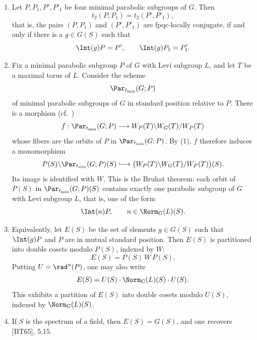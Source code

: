 \begin{enumerate}[label=\textup{(\arabic*)}]
\item Let \(P,P_1,P',P'_1\) be four minimal parabolic subgroups of
\(G\).  Then
\[
 t_2(P,P_1)=t_2(P',P'_1),
\]
that is, the pairs \((P,P_1)\) and \((P',P'_1)\) are fpqc-locally
conjugate, if and only if there is a \(g\in G(S)\) such that
\[
 \Int(g)P=P',\qquad \Int(g)P_1=P'_1.
\]

\item Fix a minimal parabolic subgroup \(P\) of \(G\) with Levi
subgroup \(L\), and let \(T\) be a maximal torus of \(L\).  Consider
the scheme
\[
 \Par_{t_{\min}}(G;P)
\]
of minimal parabolic subgroups of \(G\) in standard position
relative to \(P\).  There is a morphism \textup{(cf.\ )}
\[
 f:\Par_{t_{\min}}(G;P)
   \longrightarrow W_P(T)\backslash W_G(T)/W_P(T)
\]
whose fibers are the orbits of \(P\) in
\(\Par_{t_{\min}}(G;P)\).  By \textup{(1)}, \(f\) therefore induces
a monomorphism
\[
 P(S)\backslash\Par_{t_{\min}}(G;P)(S)
 \lhook\joinrel\longrightarrow
 \bigl(W_P(T)\backslash W_G(T)/W_P(T)\bigr)(S).
\]
Its image is identified with \(W\).  This is the Bruhat theorem:
each orbit of \(P(S)\) in \(\Par_{t_{\min}}(G;P)(S)\) contains
exactly one parabolic subgroup of \(G\) with Levi subgroup \(L\),
that is, one of the form
\[
 \Int(n)P,\qquad n\in\Norm_G(L)(S).
\]

\item Equivalently, let \(E(S)\) be the set of elements \(g\in G(S)\)
such that \(\Int(g)P\) and \(P\) are in mutual standard position.
Then \(E(S)\) is partitioned into double cosets modulo \(P(S)\),
indexed by \(W\):
\[
 E(S)=P(S)\,W\,P(S).
\]
Putting \(U=\rad^u(P)\), one may also write
\[
 E(S)=U(S)\cdot\Norm_G(L)(S)\cdot U(S).
\]
This exhibits a partition of \(E(S)\) into double cosets modulo
\(U(S)\), indexed by \(\Norm_G(L)(S)\).

\item If \(S\) is the spectrum of a field, then \(E(S)=G(S)\), and
one recovers \textup{[BT65]}, 5.15.
\end{enumerate}

